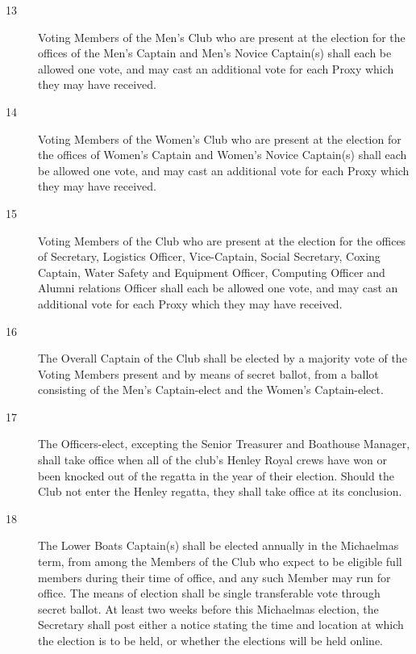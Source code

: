 \documentclass{article}
\begin{document}
\begin{description}
\begin{description}
		\item[13] Voting Members of the Men's Club who are present at the election for the
		offices of the Men's Captain and Men's Novice Captain(s) shall each be
		allowed one vote, and may cast an additional vote for each Proxy which they
		may have received.\\
		
		\item[14] Voting Members of the Women’s Club who are present at the election for the
		offices of Women’s Captain and Women’s Novice Captain(s) shall each be
		allowed one vote, and may cast an additional vote for each Proxy which they
		may have received.\\
		
		\item[15] Voting Members of the Club who are present at the election for the offices of
		Secretary, Logistics Officer, Vice-Captain, Social Secretary, Coxing Captain,
		Water Safety and Equipment Officer, Computing Officer and Alumni relations
		Officer shall each be allowed one vote, and may cast an additional vote for
		each Proxy which they may have received.\\
		
		\item[16] The Overall Captain of the Club shall be elected by a majority vote of the
		Voting Members present and by means of secret ballot, from a ballot
		consisting of the Men's Captain-elect and the Women’s Captain-elect.\\
		
		\item[17] The Officers-elect, excepting the Senior Treasurer and Boathouse Manager,
		shall take office when all of the club's Henley Royal crews have won or been knocked out of the
		regatta in the year of their election. Should the Club not enter the Henley
		regatta, they shall take office at its conclusion.\\
		
		\item[18] The Lower Boats Captain(s) shall be elected annually in the
		Michaelmas term, from among the Members of the Club who expect to
		be eligible full members during their time of office, and any such
		Member may run for office. The means of election shall be single
		transferable vote through secret ballot. At least two weeks before this
		Michaelmas election, the Secretary shall post either a notice stating the
		time and location at which the election is to be held, or whether the
		elections will be held online.\\
		

\end{description}
\end{description}
\end{document}
